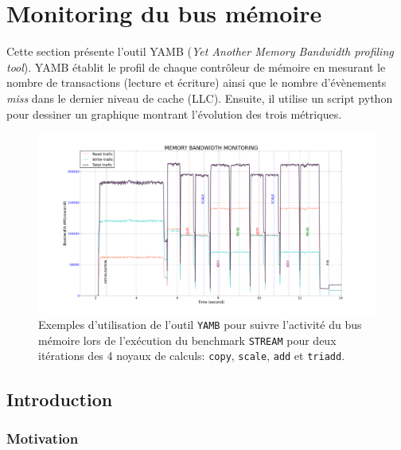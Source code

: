 \section{Monitoring du bus mémoire}\label{sec:yamb}


Cette section présente l'outil YAMB (\textit{Yet Another Memory Bandwidth profiling tool}). YAMB établit le profil de chaque contrôleur de mémoire en mesurant le nombre de transactions (lecture et écriture) ainsi que le nombre d'évènements \textit{miss} dans le dernier niveau de cache (LLC). Ensuite, il utilise un script python pour dessiner un graphique montrant l'évolution des trois métriques.

\begin{figure}[h!]
\center
\includegraphics[width=16cm]{images/yamb_stream.png}
\caption{\label{pic:yamb_stream} Exemples d'utilisation de l'outil \texttt{YAMB} pour suivre l'activité du bus mémoire lors de l'exécution du benchmark \texttt{STREAM} pour deux itérations des 4 noyaux de calculs: \texttt{copy}, \texttt{scale}, \texttt{add} et \texttt{triadd}.}
\end{figure}




\subsection{Introduction}

    \subsubsection{Motivation}
     
